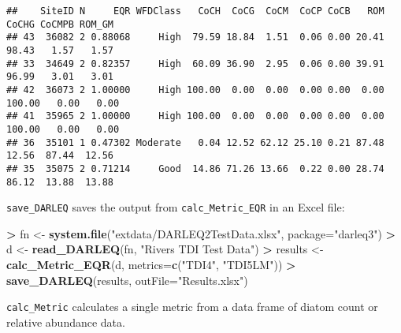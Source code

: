 \documentclass[
]{article}
\newenvironment{Shaded}{\begin{snugshade}}{\end{snugshade}}
\newcommand{\DataTypeTok}[1]{\textcolor[rgb]{0.13,0.29,0.53}{#1}}
\newcommand{\KeywordTok}[1]{\textcolor[rgb]{0.13,0.29,0.53}{\textbf{#1}}}
\newcommand{\NormalTok}[1]{#1}
\newcommand{\OperatorTok}[1]{\textcolor[rgb]{0.81,0.36,0.00}{\textbf{#1}}}
\newcommand{\StringTok}[1]{\textcolor[rgb]{0.31,0.60,0.02}{#1}}
\begin{document}
\begin{Shaded}
\end{Shaded}

\begin{verbatim}
##    SiteID N     EQR WFDClass   CoCH  CoCG  CoCM  CoCP CoCB   ROM  CoCHG CoCMPB ROM_GM
## 43  36082 2 0.88068     High  79.59 18.84  1.51  0.06 0.00 20.41  98.43   1.57   1.57
## 33  34649 2 0.82357     High  60.09 36.90  2.95  0.06 0.00 39.91  96.99   3.01   3.01
## 42  36073 2 1.00000     High 100.00  0.00  0.00  0.00 0.00  0.00 100.00   0.00   0.00
## 41  35965 2 1.00000     High 100.00  0.00  0.00  0.00 0.00  0.00 100.00   0.00   0.00
## 36  35101 1 0.47302 Moderate   0.04 12.52 62.12 25.10 0.21 87.48  12.56  87.44  12.56
## 35  35075 2 0.71214     Good  14.86 71.26 13.66  0.22 0.00 28.74  86.12  13.88  13.88
\end{verbatim}

\texttt{save\_DARLEQ} saves the output from \texttt{calc\_Metric\_EQR}
in an Excel file:

\begin{Shaded}
\begin{Highlighting}[]
\OperatorTok{>}\StringTok{ }\NormalTok{fn <-}\StringTok{ }\KeywordTok{system.file}\NormalTok{(}\StringTok{"extdata/DARLEQ2TestData.xlsx"}\NormalTok{, }\DataTypeTok{package=}\StringTok{"darleq3"}\NormalTok{)}
\OperatorTok{>}\StringTok{ }\NormalTok{d <-}\StringTok{ }\KeywordTok{read_DARLEQ}\NormalTok{(fn, }\StringTok{"Rivers TDI Test Data"}\NormalTok{)}
\OperatorTok{>}\StringTok{ }\NormalTok{results <-}\StringTok{ }\KeywordTok{calc_Metric_EQR}\NormalTok{(d, }\DataTypeTok{metrics=}\KeywordTok{c}\NormalTok{(}\StringTok{"TDI4"}\NormalTok{, }\StringTok{"TDI5LM"}\NormalTok{))}
\OperatorTok{>}\StringTok{ }\KeywordTok{save_DARLEQ}\NormalTok{(results, }\DataTypeTok{outFile=}\StringTok{"Results.xlsx"}\NormalTok{)}
\end{Highlighting}
\end{Shaded}

\texttt{calc\_Metric} calculates a single metric from a data frame of
diatom count or relative abundance data.

\begin{Shaded}
\end{Shaded}
\end{document}

